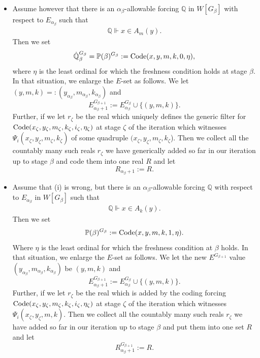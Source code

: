 \documentclass[a4paper,11pt]{article}
\newcommand{\forceP}{\mathbb{P}}
\newcommand{\forceQ}{\mathbb{Q}}
\begin{document}
\begin{itemize}
\begin{itemize}
\item[(i)] Assume however that there is an $\alpha_{\beta}$-allowable forcing $\forceQ$ in $W[G_{\beta}]$ with respect to $E_{\alpha_{\beta}}$ such that 
\begin{align*}
\forceQ \Vdash 
 x \in A_m(y).
\end{align*}
Then we set 
\[\dot{\forceQ}_{\beta}^{G_{\beta}}= \forceP(\beta)^{G_{\beta}}:= \hbox{Code} ({x}, {y}, m,k, 0,\eta),\]
where $\eta$ is the least ordinal
for which the freshness condition holds at stage $\beta$. 
In that situation, we enlarge the $E$-set as follows. We let $({y}, {m}, {k})=: ( {y}_{\alpha_{\beta}}, {m}_{\alpha_{\beta}}, {k}_{\alpha_{\beta}})$ and \[ E^{G_{\beta +1}}_{\alpha_{\beta}+1}:= E^{G_{\beta}}_{\alpha_{\beta}} \cup \{ ({y}, {m}, {k} ) \} .\]
Further, if we let $r_{\zeta}$ be the real which uniquely defines the generic filter for   $\hbox{Code} ({x}_{\zeta}, {y}_{\zeta}, m_{\zeta},k_{\zeta}, i_{\zeta},\eta_{\zeta})$ at stage $\zeta$ of the iteration which witnesses $\Psi_i(x_{\zeta},y_{\zeta},m_{\zeta}, k_{\zeta})$ of some quadruple $(x_{\zeta},y_{\zeta},m_{\zeta},k_{\zeta}$). Then we collect all the countably many such reals $r_{\zeta}$ we have generically added so far in our iteration up to stage $\beta$ and code them into one real $R$ and let
\[ R_{\alpha_{\beta}+1 }:= R . \] 
\item[(ii)] Assume that (i) is wrong, but there is an $\alpha_{\beta}$-allowable forcing $\forceQ$ with respect to $E_{\alpha_{\beta}}$  in $W[G_{\beta}]$ such that 
\begin{align*}
\forceQ \Vdash 
 x \in A_k(y).
\end{align*}
Then we set
\[\forceP(\beta)^{G_{\beta}}:= \hbox{Code} ({x}, {y}, m,k, 1,\eta).\]
Where $\eta$ is the least ordinal for which the freshness condition at $\beta$ holds.
In that situation, we enlarge the $E$-set as follows. We let the new $E^{G_{\beta+1}}$ value $({y}_{\alpha_{\beta}}, m_{\alpha_{\beta}}, k_{\alpha_{\beta}})$ be $ ( {y}, m, k)$  and \[E^{G_{\beta+1}}_{\alpha_{\beta}+1}:= E^{G_{\beta}}_{\alpha_{\beta}} \cup \{ ( {y}, m, k) \}.\]
Further, if we let $r_{\zeta}$ be the real which is added by the coding forcing $\hbox{Code} ({x}_{\zeta}, {y}_{\zeta}, m_{\zeta},k_{\zeta}, i_{\zeta},\eta_{\zeta})$ at stage $\zeta$ of the iteration which witnesses $\Psi_i (x_{\zeta},y_{\zeta},m,k)$. Then we collect all the countably many such reals $r_{\zeta}$ we have added so far in our iteration up to stage $\beta$ and put them into one set $R$ and let
\[ R^{G_{\beta+1}}_{\alpha_{\beta}+1 }:= R  . \] 


\end{itemize}
\end{itemize}
\end{document}
